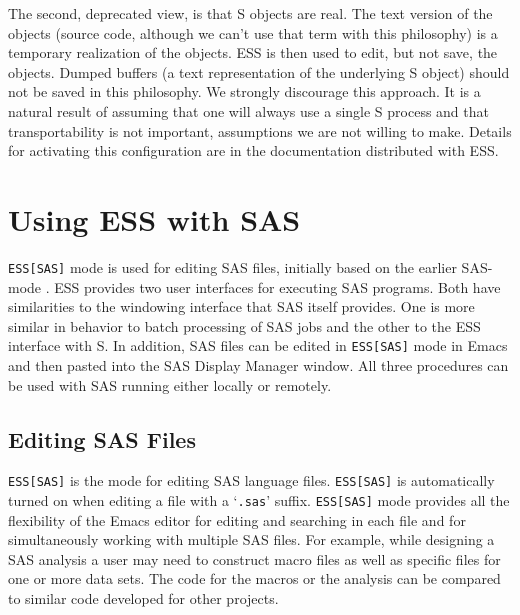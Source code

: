 \documentclass{article}
\newcommand{\stexttt}[1]{{\small\texttt{#1}}}
\newcommand{\ssf}[1]{{\small\sf{#1}}}
\newcommand{\file}[1]{`\stexttt{#1}'}
\begin{document}
The second, deprecated view, is that S objects are real.  The text
version of the objects (source code, although we can't use that term
with this philosophy) is a temporary realization of the objects.  ESS
is then used to edit, but not save, the objects.
Dumped buffers (a text representation of the underlying S object)
should not be saved in this philosophy.
We strongly discourage this approach.  It is a natural result of
assuming that one will always use a single S process and that
transportability is not important, assumptions we are not willing to
make.  Details for activating this configuration are in the
documentation distributed with ESS.


\section{Using ESS with SAS}
\label{sec:SAS}

\stexttt{ESS[SAS]} mode is used for editing SAS files, initially based
on the earlier SAS-mode \cite{SASMODE}.  ESS provides two user
interfaces for executing SAS programs.  Both have similarities to the
windowing interface that SAS itself provides.  One is more similar in
behavior to batch processing of SAS jobs and the other to the ESS
interface with S.  In addition, SAS files can be edited in
\stexttt{ESS[SAS]} mode in Emacs and then pasted into the SAS Display
Manager \ssf{Program Editor} window.  All three procedures can be used
with SAS running either locally or remotely.

\subsection{Editing SAS Files}
\label{sec:SAS:edit}

\stexttt{ESS[SAS]} is the mode for editing SAS language files.
\stexttt{ESS[SAS]} is automatically turned on when editing a file with
a \file{.sas} suffix.  \stexttt{ESS[SAS]} mode provides all the
flexibility of the Emacs editor for editing and searching in each file
and for simultaneously working with multiple SAS files.  For example,
while designing a SAS analysis a user may need to construct macro
files as well as specific files for one or more data sets.  The code
for the macros or the analysis can be compared to similar code
developed for other projects.
\end{document}
